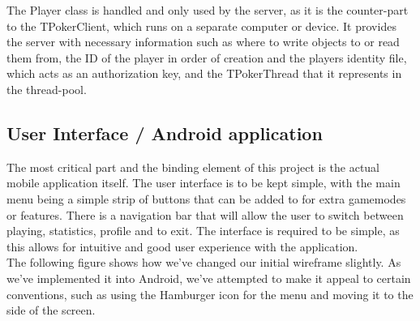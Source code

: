 \documentclass[11pt]{article}
\begin{document}

The Player class is handled and only used by the server, as it is the counter-part to the TPokerClient, which runs on a separate computer or device. It provides the server with necessary information such as where to write objects to or read them from, the ID of the player in order of creation and the players identity file, which acts as an authorization key, and the TPokerThread that it represents in the thread-pool. 


\newpage
\subsection{User Interface / Android application}

The most critical part and the binding element of this project is the actual mobile application itself. The user interface is to be kept simple, with the main menu being a simple strip of buttons that can be added to for extra gamemodes or features. There is a navigation bar that will allow the user to switch between playing, statistics, profile and to exit. 
The interface is required to be simple, as this allows for intuitive and good user experience with the application. \\

The following figure shows how we've changed our initial wireframe slightly. As we've implemented it into Android, we've attempted to make it appeal to certain conventions, such as using the Hamburger icon for the menu and moving it to the side of the screen.
\end{document}
